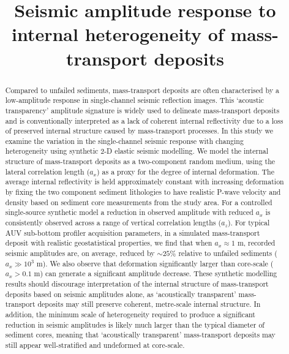 \documentclass[se,manuscript]{copernicus}
\begin{document}
\title{Seismic amplitude response to internal heterogeneity of mass-transport deposits}





\received{}
\pubdiscuss{}
\revised{}
\accepted{}
\published{}


\maketitle

\begin{abstract}
Compared to unfailed sediments, mass-transport deposits are often characterised by a low-amplitude response in single-channel seismic reflection images.
This `acoustic transparency' amplitude signature is widely used to delineate mass-transport deposits and is conventionally interpreted as a lack of coherent internal reflectivity due to a loss of preserved internal structure caused by mass-transport processes.
In this study we examine the variation in the single-channel seismic response with changing heterogeneity using synthetic 2-D elastic seismic modelling.
We model the internal structure of mass-transport deposits as a two-component random medium, using the lateral correlation length ($a_x$) as a proxy for the degree of internal deformation.
The average internal reflectivity is held approximately constant with increasing deformation by fixing the two component sediment lithologies to have realistic P-wave velocity and density based on sediment core measurements from the study area.
For a controlled single-source synthetic model a reduction in observed amplitude with reduced $a_x$ is consistently observed across a range of vertical correlation lengths ($a_z$).
For typical AUV sub-bottom profiler acquisition parameters, in a simulated mass-transport deposit with realistic geostatistical properties, we find that when $a_x \approx 1$ \unit{m}, recorded seismic amplitudes are, on average, reduced by $\sim25$\% relative to unfailed sediments ($a_x \gg 10^3$ \unit{m}).
We also observe that deformation significantly larger than core-scale ($a_x > 0.1$ \unit{m}) can generate a significant amplitude decrease.
These synthetic modelling results should discourage interpretation of the internal structure of mass-transport deposits based on seismic amplitudes alone, as `acoustically transparent' mass-transport deposits may still preserve coherent, metre-scale internal structure.
In addition, the minimum scale of heterogeneity required to produce a significant reduction in seismic amplitudes is likely much larger than the typical diameter of sediment cores, meaning that `acoustically transparent' mass-transport deposits may still appear well-stratified and undeformed at core-scale.
\end{abstract}
\end{document}
